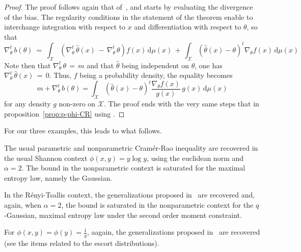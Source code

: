 \documentclass[entropy,article,submit,moreauthors,pdftex]{Definitions/mdpi}
\newcounter{GaussExample}%
\newcounter{qGaussExample}%
\newcounter{arcsineExample}%
\def\dmu{\mathrm{d}\mu}%
\def\X{\mathcal{X}}%
\begin{document}
\begin{proof}
  The proof  follows again  that of~\cite{Ber13}, and  starts by  evaluating the
  divergence of  the bias.  The  regularity conditions  in the statement  of the
  theorem  enable   to  interchange   integration  with   respect  to   $x$  and
  differentiation with respect to $\theta$, so that
  \[
  \nabla_\theta^t  \,  b(\theta)  \:  = \:  \int_\X  \left(  \nabla_\theta^t  \,
  \widehat{\theta}(x) \, - \, \nabla_\theta^t  \, \theta \right) f(x) \, \dmu(x)
  \, +  \, \int_\X \left(  \widehat{\theta}(x) - \theta  \right)^t \nabla_\theta
  f(x) \, \dmu(x)
  \]
  Note   then  that   $\nabla_\theta^t  \,   \theta  \,   =  \,   m$  and   that
  $\widehat{\theta}$ being independent on  $\theta$, one has $\nabla_\theta^t \,
  \widehat{\theta}(x) \,  = \, 0$.  Thus, $f$  being a probability  density, the
  equality becomes
  \[
  m + \nabla_\theta^t \, b(\theta) = \int_\X \left( \widehat{\theta}(x) - \theta
  \right)^t \frac{\nabla_\theta f(x)}{g(x)} \, g(x) \, \dmu(x)
  \]
  for any density $g$ non-zero on $\X$.  The proof ends with the very same steps
  that in proposition~\ref{prop:p-phi-CR} using \cite[Lemma~2]{Ber13}.
\end{proof}

%
For our three examples, this leads to what follows.
%
\begin{Example}
  The usual  parametric and nonparametric Cram\'er-Rao  inequality are recovered
  in the usual Shannon context $\phi(x,y) =  y \log y$, using the euclidean norm
  and $\alpha = 2$. The bound in  the nonparametric context is saturated for the
  maximal entropy law, namely the Gaussian.
\end{Example}
%
\begin{Example}
  In    the    R\'enyi-Tsallis    context,    the    generalizations    proposed
  in~\cite{Ber12:06_1, Ber12:06_2, Ber13} are recovered and, again, when $\alpha
  =  2$,  the   bound  is  saturated  in  the  nonparametric   context  for  the
  $q$-Gaussian, maximal entropy law under the second order moment constraint.
\end{Example}
%
\begin{Example}
  For $\phi(x,y) = \phi(y) =  \frac{1}{y}$, aagain, the generalizations proposed
  in~\cite{Ber12:06_1, Ber12:06_2,  Ber13} are recovered (see  the items related
  to the escort distributions).
\end{Example}
\end{document}

